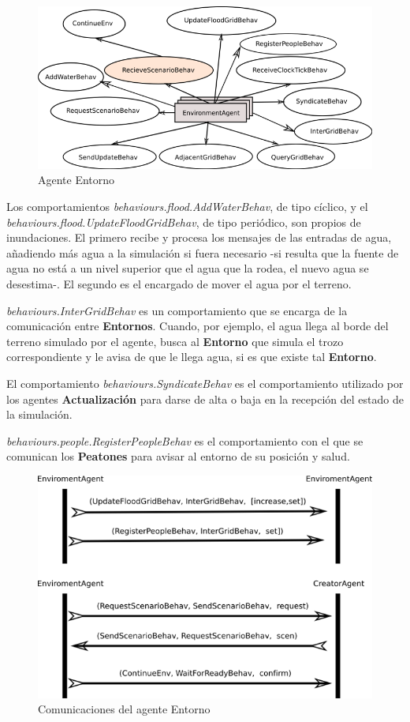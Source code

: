 \begin{figure}[H]
 \centering
 \includegraphics[width=130mm]{figuras/cap5/ag_environment.png}
 \caption{Agente Entorno}
\end{figure}

Los comportamientos {\em behaviours.flood.AddWaterBehav}, de tipo cíclico, y el
{\em behaviours.flood.UpdateFloodGridBehav}, de tipo periódico, son propios de
inundaciones. El primero recibe y procesa los mensajes de las entradas de agua,
añadiendo más agua a la simulación si fuera necesario -si resulta que la fuente
de agua no está a un nivel superior que el agua que la rodea, el nuevo agua se
desestima-. El segundo es el encargado de mover el agua por el terreno.

{\em behaviours.InterGridBehav} es un comportamiento que se encarga de la
comunicación entre {\bf Entornos}. Cuando, por ejemplo, el agua llega al borde
del terreno simulado por el agente, busca al {\bf Entorno} que simula el trozo
correspondiente y le avisa de que le llega agua, si es que existe tal {\bf
Entorno}.

El comportamiento {\em behaviours.SyndicateBehav} es el comportamiento
utilizado por los agentes {\bf Actualización} para darse de alta o baja en la
recepción del estado de la simulación.

{\em behaviours.people.RegisterPeopleBehav} es el comportamiento con el que se
comunican los {\bf Peatones} para avisar al entorno de su posición y salud.

\begin{figure}[H]
 \centering
 \includegraphics[width=120mm]{figuras/cap5/com_environment.png}
 \caption{Comunicaciones del agente Entorno}
\end{figure}

